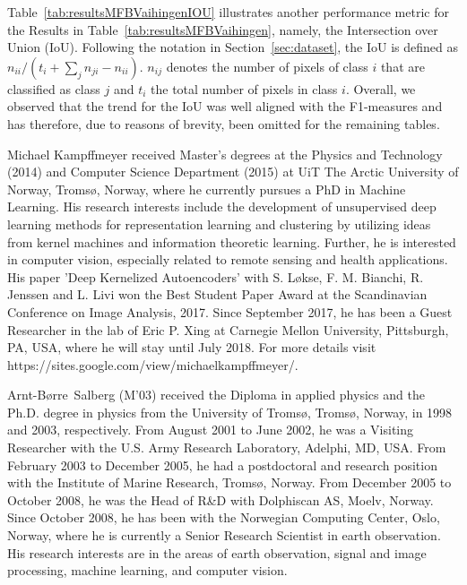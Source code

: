 \documentclass[journal]{IEEEtran}
\begin{document}
\appendix
\label{sec:appendix}
Table~\ref{tab:resultsMFBVaihingenIOU} illustrates another performance metric for the Results in Table~\ref{tab:resultsMFBVaihingen}, namely, the Intersection over Union (IoU). Following the notation in Section~\ref{sec:dataset}, the IoU is defined as $n_{ii}/(t_i + \sum_j n_{ji} - n_{ii})$. $n_{ij}$ denotes the number of pixels of class $i$ that are classified as class $j$ and $t_i$ the total number of pixels in class $i$. Overall, we observed that the trend for the IoU was well aligned with the F1-measures and has therefore, due to reasons of brevity, been omitted for the remaining tables.

\begin{IEEEbiography}{Michael Kampffmeyer}
received Master’s degrees at the Physics and Technology (2014) and Computer Science Department (2015) at UiT The Arctic University of Norway, Troms{\o}, Norway, where he currently pursues a PhD in Machine Learning. His research interests include the development of unsupervised deep learning methods for representation learning and clustering by utilizing ideas from kernel machines and information theoretic learning. Further, he is interested in computer vision, especially related to remote sensing and health applications. His paper 'Deep Kernelized Autoencoders' with S. L{\o}kse, F. M. Bianchi, R. Jenssen and L. Livi won the Best Student Paper Award at the Scandinavian Conference on Image Analysis, 2017. Since September 2017, he has been a Guest Researcher in the lab of Eric P. Xing at Carnegie Mellon University, Pittsburgh, PA, USA, where he will stay until July 2018. For more details visit https://sites.google.com/view/michaelkampffmeyer/.
\end{IEEEbiography}
\enlargethispage{-2.8in}
\vspace{-1.6cm}
\begin{IEEEbiography}{Arnt-B{\o}rre~Salberg}
(M’03) received the Diploma in applied physics and the Ph.D. degree in physics from the University of Troms{\o}, Troms{\o}, Norway, in 1998 and 2003, respectively.
From August 2001 to June 2002, he was a Visiting Researcher with the U.S. Army Research Laboratory, Adelphi, MD, USA. From February 2003 to December 2005, he had a postdoctoral and research
position with the Institute of Marine Research, Troms{\o}, Norway. From December 2005 to October 2008, he was the Head of R\&D with Dolphiscan AS, Moelv, Norway. Since October 2008, he has been with the Norwegian Computing Center, Oslo, Norway, where he is currently a Senior Research Scientist in earth observation. His research interests are in the areas of earth observation, signal and image processing, machine learning, and computer vision.
\end{IEEEbiography}
\end{document}
